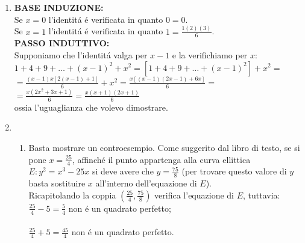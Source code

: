 \documentclass[a4paper]{article}
\newcommand{\ds}{\displaystyle}
\begin{document}
\begin{enumerate}
\item \textbf{BASE INDUZIONE:}\\
Se $x=0$ l'identit\'a \'e verificata in quanto $0=0$.\\
Se $x=1$ l'identit\'a \'e verificata in quanto $1=\ds{\frac{1(2)(3)}{6}}$.\\
\textbf{PASSO INDUTTIVO:}\\
Supponiamo che l'identit\'a valga per $x-1$ e la verifichiamo per $x$:\\
$1+4+9+ \dots +(x-1)^2+x^2=[1+4+9+ \dots +(x-1)^2]+x^2=$\\
$=\ds{\frac{(x-1)x[2(x-1)+1]}{6}+x^2=\frac{x[(x-1)(2x-1)+6x]}{6}}=$\\
$=\ds{\frac{x(2x^2+3x+1)}{6}=\frac{x(x+1)(2x+1)}{6}}$\\
ossia l'uguaglianza che volevo dimostrare.\\ 
\item \begin{enumerate}
\item Basta mostrare un controesempio. Come suggerito dal libro di testo, se si pone 
$x=\ds{\frac{25}{4}}$, affinch\'e il punto appartenga alla curva ellittica $E:y^2=x^3-25x$ si deve avere che 
$y=\ds{\frac{75}{8}}$ (per trovare questo valore di $y$ basta sostituire $x$ all'interno dell'equazione di $E$).\\
Ricapitolando la coppia $(\ds{\frac{25}{4}},\ds{\frac{75}{8}})$ verifica l'equazione di $E$, tuttavia:\\
$\ds{\frac{25}{4}-5=\frac{5}{4}}$ non \'e un quadrato perfetto;\\\\
$\ds{\frac{25}{4}+5=\frac{45}{4}}$ non \'e un quadrato perfetto.\\


\end{enumerate}
\end{enumerate}
\end{document}
